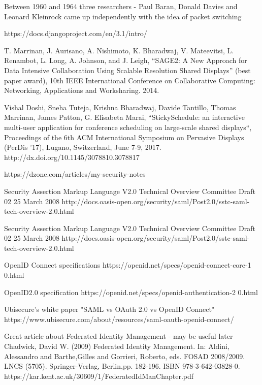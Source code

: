 \documentclass[magisterska,en]{pracamgr}
\begin{document}
Between 1960 and 1964 three researchers - Paul Baran, Donald Davies and Leonard Kleinrock came up independently with the idea of packet switching  
\begin{thebibliography}{9}

  https://docs.djangoproject.com/en/3.1/intro/
  
  T. Marrinan, J. Aurisano, A. Nishimoto, K. Bharadwaj, V. Mateevitsi, L. Renambot, L. Long, A. Johnson, and J. Leigh, “SAGE2: A New Approach for Data Intensive Collaboration Using Scalable Resolution Shared Displays” (best paper award), 10th IEEE International Conference on Collaborative Computing: Networking, Applications and Worksharing. 2014.
  
  Vishal Doshi, Sneha Tuteja, Krishna Bharadwaj, Davide Tantillo, Thomas Marrinan, James Patton, G. Elisabeta Marai, “StickySchedule: an interactive multi-user application for conference scheduling on large-scale shared displays“, Proceedings of the 6th ACM International Symposium on Pervasive Displays (PerDis ’17), Lugano, Switzerland, June 7-9, 2017. http://dx.doi.org/10.1145/3078810.3078817
  
  
  https://dzone.com/articles/my-security-notes
  
 Security Assertion Markup Language V2.0 Technical Overview
 Committee Draft 02
 25 March 2008
 http://docs.oasis-open.org/security/saml/Post2.0/sstc-saml-tech-overview-2.0.html
 
 Security Assertion Markup Language V2.0 Technical Overview
 Committee Draft 02
 25 March 2008
 http://docs.oasis-open.org/security/saml/Post2.0/sstc-saml-tech-overview-2.0.html
 
 
 OpenID Connect specifications
 https://openid.net/specs/openid-connect-core-1 0.html
 
OpenID2.0 specification
https://openid.net/specs/openid-authentication-2 0.html
 
Ubisecure's white paper "SAML vs OAuth 2.0 vs OpenID Connect"
https://www.ubisecure.com/about/resources/saml-oauth-openid-connect/

Great article about Federated Identity Management - may be useful later
Chadwick, David W.  (2009) Federated Identity Management.    In: Aldini, Alessandro and Barthe,Gilles and Gorrieri, Roberto, eds. FOSAD 2008/2009.   LNCS  (5705).  Springer-Verlag, Berlin,pp. 182-196. ISBN 978-3-642-03828-0.
https://kar.kent.ac.uk/30609/1/FederatedIdManChapter.pdf
 

\end{thebibliography}
\end{document}
